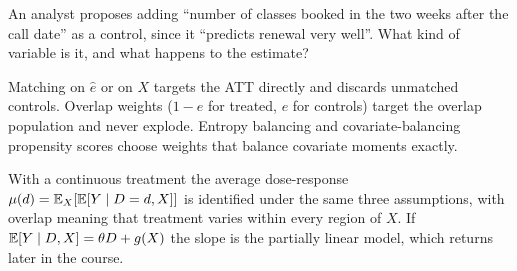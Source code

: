 \documentclass[11pt]{article}
\begin{document}
\begin{exercise}[judgment]
An analyst proposes adding ``number of classes booked in the two weeks after the call date'' as a control, since it ``predicts
renewal very well''. What kind of variable is it, and what happens to the estimate?
\end{exercise}

\sectionthree

\begin{extension}
Matching on $\hat e$ or on $X$ targets the ATT directly and discards unmatched controls. Overlap weights ($1 - e$ for treated, $e$ for
controls) target the overlap population and never explode. Entropy balancing and covariate-balancing propensity scores choose weights
that balance covariate moments exactly.
\end{extension}

\begin{extension}
With a continuous treatment the average dose-response $\mu(d) = \mathbb{E}_X[\mathbb{E}[Y \mid D=d, X]]$ is identified under the same three assumptions,
with overlap meaning that treatment varies within every region of $X$. If $\mathbb{E}[Y \mid D, X] = \theta D + g(X)$ the slope is the partially linear
model, which returns later in the course.
\end{extension}
\end{document}

